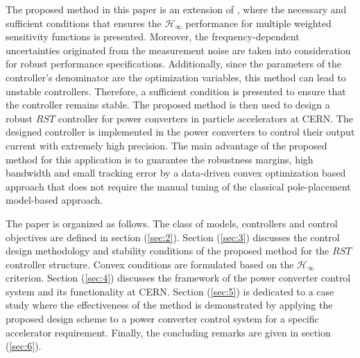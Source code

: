 \documentclass[journal]{IEEEtran}
\begin{document}
The proposed method in this paper is an extension of \cite{NEK15}, where the necessary and sufficient conditions that ensures the $\mathcal{H}_{\infty}$ performance for multiple weighted sensitivity functions is presented. Moreover, the frequency-dependent uncertainties originated from the measurement noise are taken into consideration for robust performance specifications. Additionally, since the parameters of the controller's denominator are the optimization variables, this method can lead to unstable controllers. Therefore, a sufficient condition is presented to ensure that the controller remains stable. The proposed method is then used to design a robust $RST$ controller for power converters in particle accelerators at CERN. The designed controller is implemented in the power converters to control their output current with extremely high precision. The main advantage of the proposed method for this application is to guarantee the robustness margins, high bandwidth and small tracking error by a data-driven convex optimization based approach that does not require the manual tuning of the classical pole-placement model-based approach.

The paper is organized as follows.
The class of models, controllers and control objectives are defined in section (\ref{sec:2}). Section (\ref{sec:3}) discusses the control design methodology and stability conditions of the proposed method for the $RST$ controller structure. Convex conditions are formulated based on the $\mathcal{H}_{\infty}$ criterion. Section (\ref{sec:4}) discusses the framework of the power converter control system and its functionality at CERN. Section (\ref{sec:5}) is dedicated to a case study where the effectiveness of the method is demonstrated by applying the proposed design scheme to a power converter control system for a specific accelerator requirement. Finally, the concluding remarks are given in section (\ref{sec:6}).
\end{document}
